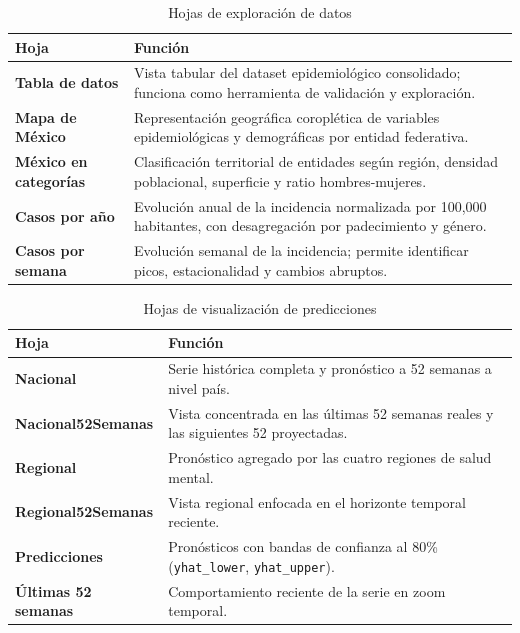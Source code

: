 \documentclass[12pt, letterpaper]{article}
\begin{document}
\begin{table}[H]
\centering
\caption{Hojas de exploración de datos}
\label{tab:hojas_exploracion}
\small
\begin{tabularx}{\textwidth}{>{\bfseries}l X}
\toprule
\textbf{Hoja} & \textbf{Función} \\
\midrule
Tabla de datos      & Vista tabular del dataset epidemiológico consolidado; funciona como herramienta de validación y exploración. \\
Mapa de México      & Representación geográfica coroplética de variables epidemiológicas y demográficas por entidad federativa. \\
México en categorías & Clasificación territorial de entidades según región, densidad poblacional, superficie y ratio hombres-mujeres. \\
Casos por año       & Evolución anual de la incidencia normalizada por 100,000 habitantes, con desagregación por padecimiento y género. \\
Casos por semana    & Evolución semanal de la incidencia; permite identificar picos, estacionalidad y cambios abruptos. \\
\bottomrule
\end{tabularx}
\end{table}

\begin{table}[H]
\centering
\caption{Hojas de visualización de predicciones}
\label{tab:hojas_predicciones}
\small
\begin{tabularx}{\textwidth}{>{\bfseries}l X}
\toprule
\textbf{Hoja} & \textbf{Función} \\
\midrule
Nacional            & Serie histórica completa y pronóstico a 52 semanas a nivel país. \\
Nacional52Semanas   & Vista concentrada en las últimas 52 semanas reales y las siguientes 52 proyectadas. \\
Regional            & Pronóstico agregado por las cuatro regiones de salud mental. \\
Regional52Semanas   & Vista regional enfocada en el horizonte temporal reciente. \\
Predicciones        & Pronósticos con bandas de confianza al 80\% (\texttt{yhat\_lower}, \texttt{yhat\_upper}). \\
Últimas 52 semanas  & Comportamiento reciente de la serie en zoom temporal. \\
\bottomrule
\end{tabularx}
\end{table}
\end{document}
